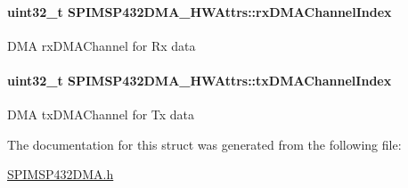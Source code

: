 \paragraph[{rx\+D\+M\+A\+Channel\+Index}]{\setlength{\rightskip}{0pt plus 5cm}uint32\+\_\+t S\+P\+I\+M\+S\+P432\+D\+M\+A\+\_\+\+H\+W\+Attrs\+::rx\+D\+M\+A\+Channel\+Index}\label{struct_s_p_i_m_s_p432_d_m_a___h_w_attrs_ae317a28e3bc9f3da0ffa31f08569a3fe}
D\+M\+A rx\+D\+M\+A\+Channel for Rx data 
\paragraph[{tx\+D\+M\+A\+Channel\+Index}]{\setlength{\rightskip}{0pt plus 5cm}uint32\+\_\+t S\+P\+I\+M\+S\+P432\+D\+M\+A\+\_\+\+H\+W\+Attrs\+::tx\+D\+M\+A\+Channel\+Index}\label{struct_s_p_i_m_s_p432_d_m_a___h_w_attrs_a11be81dbcc615865601d1a3511324f1e}
D\+M\+A tx\+D\+M\+A\+Channel for Tx data 

The documentation for this struct was generated from the following file\+:\begin{DoxyCompactItemize}
\item 
\hyperlink{_s_p_i_m_s_p432_d_m_a_8h}{S\+P\+I\+M\+S\+P432\+D\+M\+A.\+h}\end{DoxyCompactItemize}
